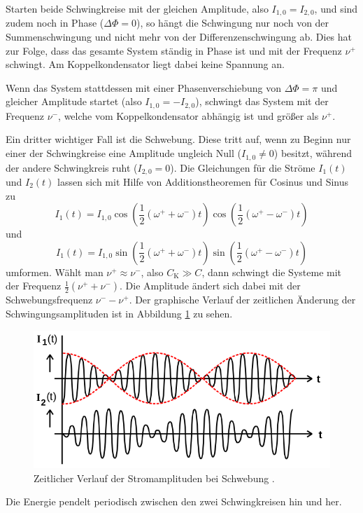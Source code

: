 Starten beide Schwingkreise mit der gleichen Amplitude, also $I_{1,0} = I_{2,0}$,
und sind zudem noch in Phase ($\Delta \Phi = 0$), so hängt die Schwingung nur noch
von der Summenschwingung und nicht mehr von der Differenzenschwingung ab. Dies
hat zur Folge, dass das gesamte System ständig in Phase ist und mit der Frequenz
$\nu^{+}$ schwingt. Am Koppelkondensator liegt dabei keine Spannung an.

Wenn das System stattdessen mit einer Phasenverschiebung von $\Delta \Phi = \pi$
und gleicher Amplitude startet (also $I_{1,0} = - I_{2,0}$), schwingt das System
mit der Frequenz $\nu^{-}$, welche vom Koppelkondensator abhängig ist und größer
als $\nu^{+}$.

Ein dritter wichtiger Fall ist die Schwebung. Diese tritt auf, wenn zu Beginn
nur einer der Schwingkreise eine Amplitude ungleich Null ($I_{1,0} \neq 0$)
besitzt, während der andere Schwingkreis ruht ($I_{2,0} = 0$). Die Gleichungen
für die Ströme $I_1(t)$ und $I_2(t)$ lassen sich mit Hilfe von Additionstheoremen
für Cosinus und Sinus zu
\begin{equation}
  I_1(t) = I_{1,0} \cos\left(\frac{1}{2}(\omega^{+}+\omega^{-})t\right)
  \cos\left(\frac{1}{2}(\omega^{+}-\omega^{-})t\right)
  \label{eqn:schwebung_I1}
\end{equation}
und
\begin{equation}
  I_1(t) = I_{1,0} \sin\left(\frac{1}{2}(\omega^{+}+\omega^{-})t\right)
  \sin\left(\frac{1}{2}(\omega^{+}-\omega^{-})t\right)
  \label{eqn:schwebung_I2}
\end{equation}
umformen.
Wählt man $\nu^{+} \approx \nu^{-}$, also $C_\text{K} \gg C$, dann schwingt die
Systeme mit der Frequenz $\frac{1}{2}(\nu^{+} + \nu^{-})$. Die Amplitude ändert
sich dabei mit der Schwebungsfrequenz $\nu^{-} - \nu^{+}$. Der graphische Verlauf
der zeitlichen Änderung der Schwingungsamplituden ist in Abbildung \ref{fig:schwebung}
zu sehen.
\begin{figure}
  \centering
  \includegraphics[width=\textwidth]{schwebung.png}
  \caption{Zeitlicher Verlauf der Stromamplituden bei Schwebung \cite{sample}.}
  \label{fig:schwebung}
\end{figure}
Die Energie pendelt periodisch zwischen den zwei Schwingkreisen hin und her.

